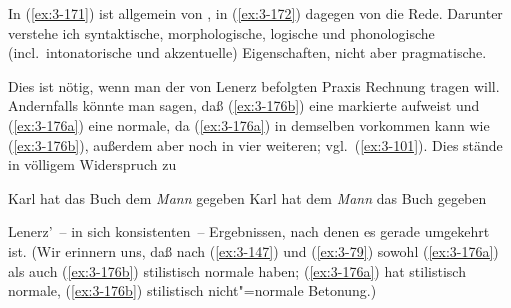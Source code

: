 \documentclass[output=paper]{langsci/langscibook}
\begin{document}
\addlines
In (\ref{ex:3-171}) ist allgemein von , in (\ref{ex:3-172}) dagegen von
 die Rede. Darunter verstehe ich
syntaktische, morphologische, logische und phonologische
(incl.\ intonatorische und akzentuelle) Eigenschaften, nicht aber
pragmatische.

Dies ist nötig, wenn man der von Lenerz befolgten Praxis Rechnung
tragen will. Andernfalls könnte man \zb sagen, daß (\ref{ex:3-176b}) eine
markierte  aufweist und (\ref{ex:3-176a}) eine normale, da (\ref{ex:3-176a}) in demselben  vorkommen kann wie (\ref{ex:3-176b}), außerdem aber noch
in vier weiteren; vgl.\ (\ref{ex:3-101}). Dies stände in völligem Widerspruch zu
\begin{exe}
\ex
\label{ex:3-176}
\begin{xlist}
\ex
\label{ex:3-176a}
Karl hat das Buch dem \textit{Mann} gegeben
\ex
\label{ex:3-176b}
Karl hat dem \textit{Mann} das Buch gegeben
\end{xlist}
\end{exe}
Lenerz'~-- in sich konsistenten~-- Ergebnissen, nach denen es gerade
umgekehrt ist. (Wir erinnern uns, daß nach (\ref{ex:3-147}) und (\ref{ex:3-79}) sowohl (\ref{ex:3-176a}) als auch (\ref{ex:3-176b}) stilistisch normale  haben; (\ref{ex:3-176a}) hat stilistisch normale, (\ref{ex:3-176b}) stilistisch nicht"=normale Betonung.)
\end{document}
